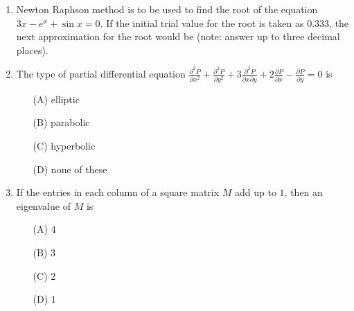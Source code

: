 \documentclass[journal,12pt,onecolumn]{IEEEtran}
\theoremstyle{remark}
\begin{document}
\begin{enumerate}
    \item Newton Raphson method is to be used to find the root of the equation $3x - e^x + \sin x = 0$. If the initial trial value for the root is taken as $0.333$, the next approximation for the root would be (note: answer up to three decimal places).
    
\item The type of partial differential equation 
    $ \frac{\partial^2 P}{\partial x^2} + \frac{\partial^2 P}{\partial y^2} + 3 \frac{\partial^2 P}{\partial x \partial y} + 2 \frac{\partial P}{\partial x} - \frac{\partial P}{\partial y} = 0 $
    is
    \begin{enumerate}
        \item[(A)] elliptic
        \item[(B)] parabolic
        \item[(C)] hyperbolic
        \item[(D)] none of these
    \end{enumerate}
    
    \item If the entries in each column of a square matrix $M$ add up to $1$, then an eigenvalue of $M$ is
    \begin{enumerate}
        \item[(A)] $4$
        \item[(B)] $3$
        \item[(C)] $2$
        \item[(D)] $1$
    \end{enumerate}
    
\end{enumerate}
\end{document}
